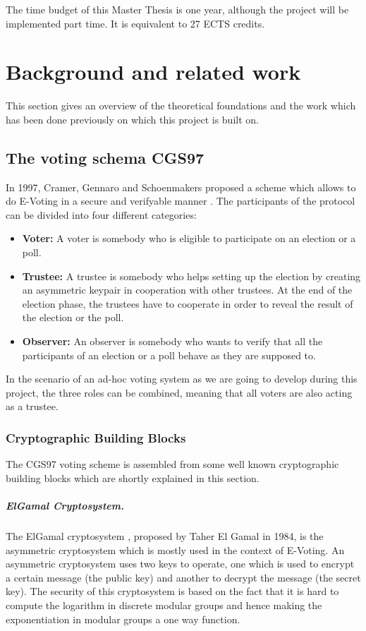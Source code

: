 \documentclass[numbers=noenddot, abstract=on]{scrreprt}
\begin{document}
The time budget of this Master Thesis is one year, although the project will be
implemented part time. It is equivalent to 27 ECTS credits. 

\chapter{Background and related work}
This section gives an overview of the theoretical foundations and the work which
has been done previously on which this project is built on.

\section{The voting schema CGS97}
In 1997, Cramer, Gennaro and Schoenmakers proposed a scheme which allows to
do E-Voting in a secure and verifyable manner \cite{CGS97}. The participants of
the protocol can be divided into four different categories:
\begin{itemize}
  \item \textbf{Voter: } A voter is somebody who is eligible to participate on
  an election or a poll. 
  \item \textbf{Trustee: } A trustee is somebody who helps setting up the
  election by creating an asymmetric keypair in cooperation with other trustees.
  At the end of the election phase, the trustees have to cooperate in order to
  reveal the result of the election or the poll.
  \item \textbf{Observer: } An observer is somebody who wants to verify that all
  the participants of an election or a poll behave as they are supposed to.
\end{itemize}

In the scenario of an ad-hoc voting system as we are going to develop during
this project, the three roles can be combined, meaning that all voters are also
acting as a trustee. 

\subsection{Cryptographic Building Blocks}
The CGS97 voting scheme is assembled from some well known cryptographic building
blocks which are shortly explained in this section.

\paragraph{ElGamal Cryptosystem.} The ElGamal cryptosystem \cite{EG84}, proposed
by Taher El Gamal in 1984, is the asymmetric cryptosystem which is mostly used in the
context of E-Voting. An asymmetric cryptosystem uses two keys to operate, one
which is used to encrypt a certain message (the public key) and another to
decrypt the message (the secret key). The security of this cryptosystem is based
on the fact that it is hard to compute the logarithm in discrete modular groups
and hence making the exponentiation in modular groups a one way function. 
\end{document}
